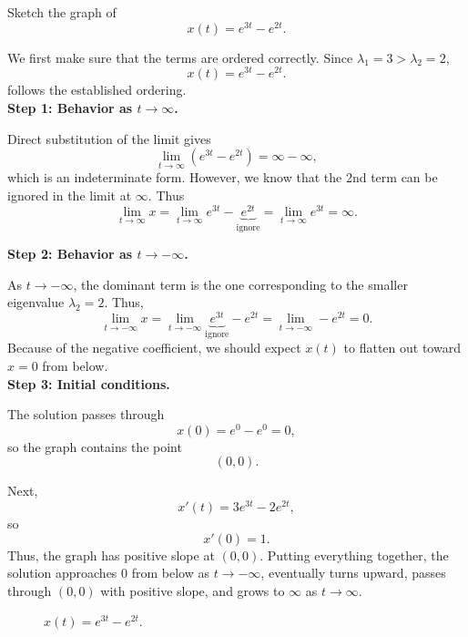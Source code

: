 \documentclass[10pt,letterpaper]{article}
\begin{document}
\begin{example}[3]
{Sketch the graph of
\[
x(t)=e^{3t}-e^{2t}.
\]
}

We first make sure that the terms are ordered correctly. Since $\lambda_1=3>\lambda_2=2$, 
$$
x(t)=e^{3t}-e^{2t}.
$$
follows the established ordering.\\

\textbf{Step 1: Behavior as $t\to\infty$.}

Direct substitution of the limit gives
\[
\lim_{t\to\infty}\left(e^{3t}-e^{2t}\right)
=\infty-\infty,
\]
which is an indeterminate form. However, we know that the 2nd term can be ignored in the limit at $\infty$. Thus 
$$ 
 \lim_{t\to\infty}x =    \lim_{t\to \infty} e^{3t}-\underbrace{e^{2t}}_{\text{ignore}} = \lim_{t\to\infty}  e^{3 t}=\infty.
$$



\textbf{Step 2: Behavior as $t\to-\infty$.}

As $t\to-\infty$, the dominant term is the one corresponding to the
smaller eigenvalue $\lambda_2=2$. Thus,
$$ 
 \lim_{t\to-\infty}x =    \lim_{t\to-\infty} \underbrace{e^{3t}}_{\text{ignore}} -e^{2t}= \lim_{t\to-\infty}  -e^{2 t}=0.
$$
Because of the negative coefficient, we should expect $x(t)$ to flatten out toward $x=0$ from below.\\

\textbf{Step 3: Initial conditions.}

The solution passes through
\[
x(0)=e^0-e^0=0,
\]
so the graph contains the point
\[
(0,0).
\]

Next,
\[
x'(t)=3e^{3t}-2e^{2t},
\]
so
\[
x'(0)=1.
\]
Thus, the graph has positive slope at $(0,0)$. Putting everything together, the solution approaches $0$ from below
as $t\to-\infty$, eventually turns upward, passes through $(0,0)$ with
positive slope, and grows to $\infty$ as $t\to\infty$.

\begin{figure}[H]
    \centering
\caption{$x(t)=e^{3t}-e^{2t}$.}
\end{figure}

\end{example}
\end{document}
